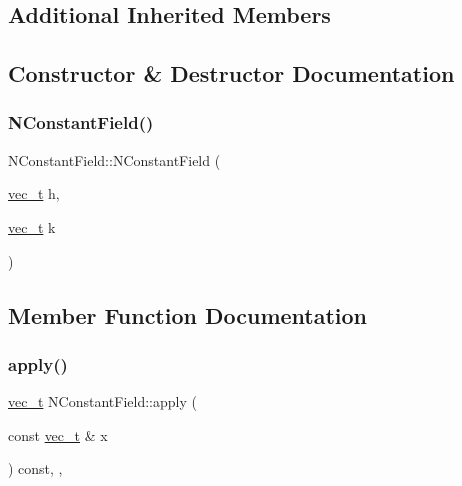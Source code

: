 \subsection*{Additional Inherited Members}


\subsection{Constructor \& Destructor Documentation}
\mbox{\label{class_n_constant_field_a0bf33435d6fb4f605c1c85cf0d9ff770}} 
\subsubsection{\texorpdfstring{NConstantField()}{NConstantField()}}
{\footnotesize\ttfamily N\+Constant\+Field\+::\+N\+Constant\+Field (\begin{DoxyParamCaption}\item[{\mbox{\hyperlink{group___n_algebra_ga0a2cfc67e738a3d73e4f12098c4c07f6}{vec\+\_\+t}}}]{h,  }\item[{\mbox{\hyperlink{group___n_algebra_ga0a2cfc67e738a3d73e4f12098c4c07f6}{vec\+\_\+t}}}]{k }\end{DoxyParamCaption})}



\subsection{Member Function Documentation}
\mbox{\label{class_n_constant_field_a2b81a6a4f9fa56580002d180ac769c9b}} 
\subsubsection{\texorpdfstring{apply()}{apply()}}
{\footnotesize\ttfamily \mbox{\hyperlink{group___n_algebra_ga0a2cfc67e738a3d73e4f12098c4c07f6}{vec\+\_\+t}} N\+Constant\+Field\+::apply (\begin{DoxyParamCaption}\item[{const \mbox{\hyperlink{group___n_algebra_ga0a2cfc67e738a3d73e4f12098c4c07f6}{vec\+\_\+t}} \&}]{x }\end{DoxyParamCaption}) const\hspace{0.3cm}{\ttfamily [override]}, {\ttfamily [protected]}, {\ttfamily [virtual]}}



